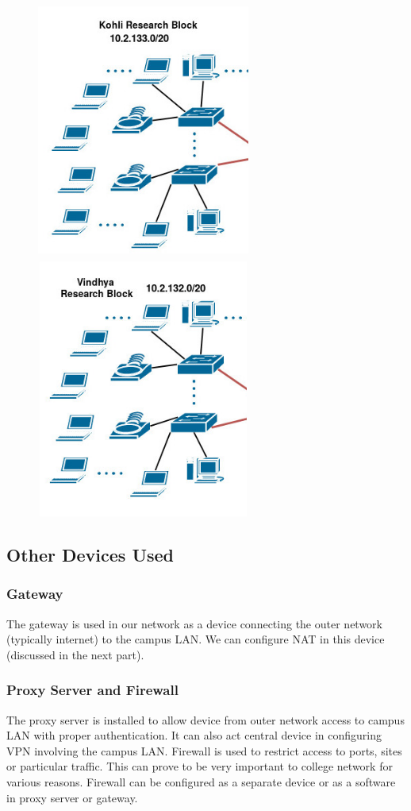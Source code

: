 \documentclass{article}
\begin{document}
\begin{figure}[htb]
	\includegraphics[width=7cm,height=8.5cm]{KRB.jpg}
	\includegraphics[width=7cm,height=8.5cm]{vindhya.jpg}
\end{figure}

\subsection{Other Devices Used}
\subsubsection{Gateway}
The gateway is used in our network as a device connecting the outer network (typically internet) to the campus LAN. We can configure NAT in this device (discussed in the next part).
\subsubsection{Proxy Server and Firewall}
The proxy server is installed to allow device from outer network access to campus LAN with proper authentication. It can also act central device in configuring VPN involving the campus LAN. Firewall is used to restrict access to ports, sites or particular traffic. This can prove to be very important to college network for various reasons. Firewall can be configured as a separate device or as a software in proxy server or gateway.
\end{document}

